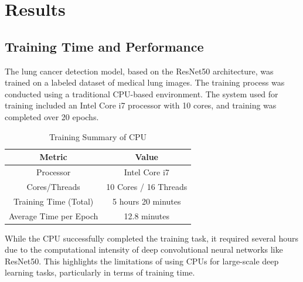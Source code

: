 
\section{Results} 


\subsection{Training Time and Performance} 

The lung cancer detection model, based on the ResNet50 architecture, was trained on a labeled 
dataset of medical lung images. The training process was conducted using a traditional CPU-based 
environment. The system used for training included an Intel Core i7 processor with 10 cores, and 
training was completed over 20 epochs.

\begin{table}[H] 
\centering
\begin{tabular}{|c|c|} %
\hline
\textbf{Metric} & \textbf{Value} \\ %
\hline
Processor & Intel Core i7 \\ %
Cores/Threads & 10 Cores / 16 Threads \\
Training Time (Total) & 5 hours 20 minutes \\ %
Average Time per Epoch & 12.8 minutes \\ %
\hline
\end{tabular}
\caption{Training Summary of CPU} %
\end{table}

While the CPU successfully completed the training task, it required several hours due to the 
computational intensity of deep convolutional neural networks like ResNet50. This highlights the 
limitations of using CPUs for large-scale deep learning tasks, particularly in terms of training 
time.

